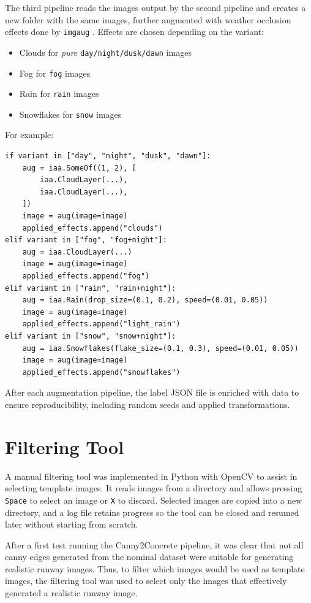 The third pipeline reads the images output by the second pipeline and creates a new folder with the same images, further augmented with weather occlusion effects done by \texttt{imgaug} \cite{jung_imgaug_2020}. 
Effects are chosen depending on the variant:

\begin{itemize}
\item Clouds for \emph{pure} \texttt{day/night/dusk/dawn} images
\item Fog for \texttt{fog} images
\item Rain for \texttt{rain} images
\item Snowflakes for \texttt{snow} images
\end{itemize}

For example:

\begin{lstlisting}
if variant in ["day", "night", "dusk", "dawn"]:
    aug = iaa.SomeOf((1, 2), [
        iaa.CloudLayer(...),
        iaa.CloudLayer(...),
    ])
    image = aug(image=image)
    applied_effects.append("clouds")
elif variant in ["fog", "fog+night"]:
    aug = iaa.CloudLayer(...)
    image = aug(image=image)
    applied_effects.append("fog")
elif variant in ["rain", "rain+night"]:
    aug = iaa.Rain(drop_size=(0.1, 0.2), speed=(0.01, 0.05))
    image = aug(image=image)
    applied_effects.append("light_rain")
elif variant in ["snow", "snow+night"]:
    aug = iaa.Snowflakes(flake_size=(0.1, 0.3), speed=(0.01, 0.05))
    image = aug(image=image)
    applied_effects.append("snowflakes")
\end{lstlisting}

After each augmentation pipeline, the label JSON file is enriched with data to ensure reproducibility, including random seeds and applied transformations.

\section{Filtering Tool}

A manual filtering tool was implemented in Python with OpenCV to assist in selecting template images. 
It reads images from a directory and allows pressing \texttt{Space} to select an image or \texttt{X} to discard. 
Selected images are copied into a new directory, and a log file retains progress so the tool can be closed and resumed later without starting from scratch.

After a first test running the Canny2Concrete pipeline, it was clear that not
all canny edges generated from the nominal dataset were suitable for generating
realistic runway images. Thus, to filter which images would be used as template
images, the filtering tool was used to select only the images that effectively
generated a realistic runway image.

